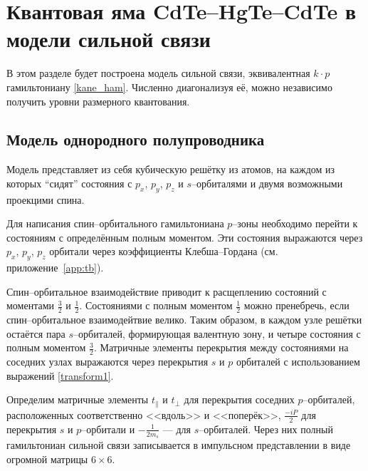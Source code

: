 \section{Квантовая яма CdTe--HgTe--CdTe в модели сильной связи}
В этом разделе будет построена модель сильной связи, эквивалентная $k\cdot p$ гамильтониану
\eqref{kane_ham}. Численно диагонализуя её, можно независимо получить уровни размерного 
квантования.
\subsection{Модель однородного полупроводника}
Модель представляет из себя 
кубическую решётку из атомов, на каждом из которых ``сидят'' состояния
с $p_x$, $p_y$, $p_z$ и $s$--орбиталями и двумя 
возможными проекцими спина.

Для написания
спин--орбитального гамильтониана $p$--зоны необходимо перейти к состояниям с определённым
полным моментом. Эти состояния выражаются через $p_x$, $p_y$, $p_z$ орбитали через
коэффициенты Клебша--Гордана (см. приложение~\ref{app:tb}).

Спин--орбитальное взаимодействие приводит к расщеплению состояний с моментами $\frac32$ и
$\frac12$.
Состояниями с полным моментом $\frac{1}{2}$ 
можно пренебречь, если спин--орбитальное взаимодейтвие велико. Таким образом, в каждом
узле решётки остаётся пара $s$--орбиталей, формирующая валентную зону, и четыре состояния
с полным моментом $\frac{3}{2}$. Матричные элементы перекрытия между состояниями на соседних
узлах выражаются через перекрытия $s$ и $p$ орбиталей с использованием выражений 
\eqref{transform1}. 

Определим матричные элементы $t_\parallel$ и $t_\perp$ для перекрытия соседних $p$--орбиталей,
расположенных соответственно <<вдоль>> и <<поперёк>>, $\frac{-iP}{2}$ для перекрытия
$s$ и $p$--орбитали и $-\frac{1}{2m_s}$ --- для $s$--орбиталей. Через них полный гамильтониан
сильной связи записывается в импульсном представлении в виде огромной матрицы $6\times6$. 

